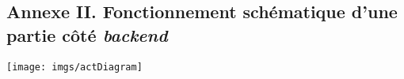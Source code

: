 \begin{landscape}
   \section*{Annexe II. Fonctionnement schématique d'une partie côté \textit{backend}}
   \begin{center}
      \texttt{[image: imgs/actDiagram]}
   \end{center}
\end{landscape}